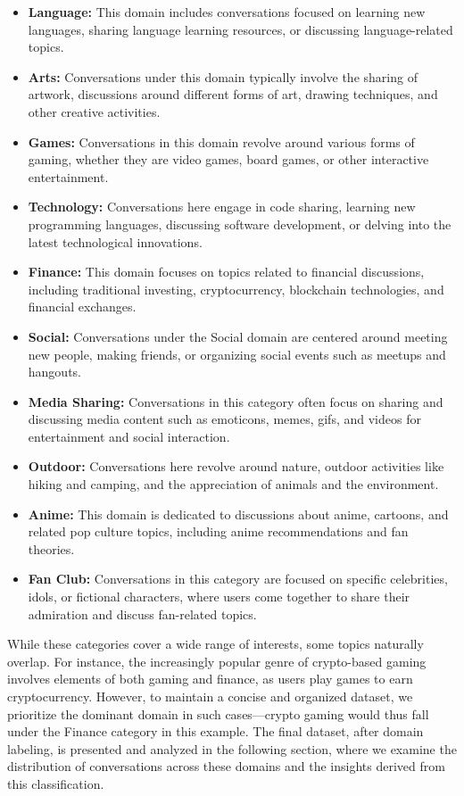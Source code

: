 \begin{itemize}
    \item \textbf{Language:} This domain includes conversations focused on learning new languages, sharing language learning resources, or discussing language-related topics.
    \item \textbf{Arts:} Conversations under this domain typically involve the sharing of artwork, discussions around different forms of art, drawing techniques, and other creative activities.
    \item \textbf{Games:} Conversations in this domain revolve around various forms of gaming, whether they are video games, board games, or other interactive entertainment.
    \item \textbf{Technology:} Conversations here engage in code sharing, learning new programming languages, discussing software development, or delving into the latest technological innovations.
    \item \textbf{Finance:} This domain focuses on topics related to financial discussions, including traditional investing, cryptocurrency, blockchain technologies, and financial exchanges.
    \item \textbf{Social:} Conversations under the Social domain are centered around meeting new people, making friends, or organizing social events such as meetups and hangouts.
    \item \textbf{Media Sharing:} Conversations in this category often focus on sharing and discussing media content such as emoticons, memes, gifs, and videos for entertainment and social interaction.
    \item \textbf{Outdoor:} Conversations here revolve around nature, outdoor activities like hiking and camping, and the appreciation of animals and the environment.
    \item \textbf{Anime:} This domain is dedicated to discussions about anime, cartoons, and related pop culture topics, including anime recommendations and fan theories.
    \item \textbf{Fan Club:} Conversations in this category are focused on specific celebrities, idols, or fictional characters, where users come together to share their admiration and discuss fan-related topics.
\end{itemize}

While these categories cover a wide range of interests, some topics naturally overlap. For instance, the increasingly popular genre of crypto-based gaming involves elements of both gaming and finance, as users play games to earn cryptocurrency. However, to maintain a concise and organized dataset, we prioritize the dominant domain in such cases—crypto gaming would thus fall under the Finance category in this example. The final dataset, after domain labeling, is presented and analyzed in the following section, where we examine the distribution of conversations across these domains and the insights derived from this classification.

